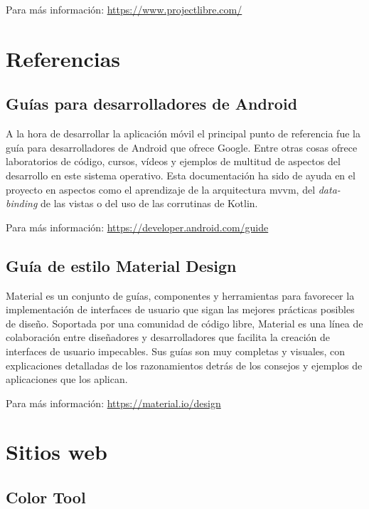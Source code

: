 Para más información: \href{https://www.projectlibre.com/}{https://www.projectlibre.com/}

\section{Referencias}

\subsection{Guías para desarrolladores de Android}

A la hora de desarrollar la aplicación móvil el principal punto de referencia fue la guía para desarrolladores de Android que ofrece Google. Entre otras cosas ofrece laboratorios de código, cursos, vídeos y ejemplos de multitud de aspectos del desarrollo en este sistema operativo. Esta documentación ha sido de ayuda en el proyecto en aspectos como el aprendizaje de la arquitectura \acrshort{mvvm}, del \emph{data-binding} de las vistas o del uso de las corrutinas de Kotlin.

Para más información: \href{https://developer.android.com/guide}{https://developer.android.com/guide}

\subsection{Guía de estilo Material Design}
\label{ssec:guia_material_design}

Material es un conjunto de guías, componentes y herramientas para favorecer la implementación de interfaces de usuario que sigan las mejores prácticas posibles de diseño. Soportada por una comunidad de código libre, Material es una línea de colaboración entre diseñadores y desarrolladores que facilita la creación de interfaces de usuario impecables. Sus guías son muy completas y visuales, con explicaciones detalladas de los razonamientos detrás de los consejos y ejemplos de aplicaciones que los aplican.

Para más información: \href{https://material.io/design}{https://material.io/design}

\newpage
\section{Sitios web}

\subsection{Color Tool}
\label{ssec:color_tool}

